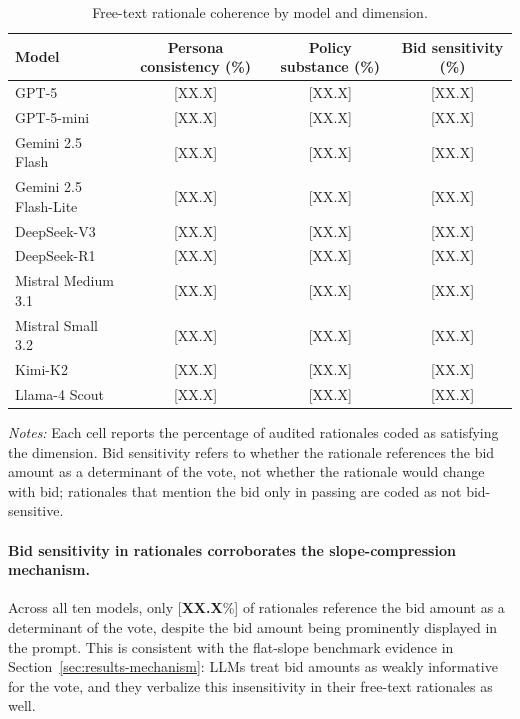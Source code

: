 \documentclass[12pt]{article}
\begin{document}
\begin{table}[h]
    \centering
    \caption{Free-text rationale coherence by model and dimension.}
    \label{tab:rationale}
    \begin{threeparttable}
    \begin{tabular}{lccc}
        \toprule
        Model & Persona consistency (\%) & Policy substance (\%) & Bid sensitivity (\%) \\
        \midrule
        GPT-5                 & [XX.X] & [XX.X] & [XX.X] \\
        GPT-5-mini            & [XX.X] & [XX.X] & [XX.X] \\
        Gemini 2.5 Flash      & [XX.X] & [XX.X] & [XX.X] \\
        Gemini 2.5 Flash-Lite & [XX.X] & [XX.X] & [XX.X] \\
        DeepSeek-V3           & [XX.X] & [XX.X] & [XX.X] \\
        DeepSeek-R1           & [XX.X] & [XX.X] & [XX.X] \\
        Mistral Medium 3.1    & [XX.X] & [XX.X] & [XX.X] \\
        Mistral Small 3.2     & [XX.X] & [XX.X] & [XX.X] \\
        Kimi-K2               & [XX.X] & [XX.X] & [XX.X] \\
        Llama-4 Scout         & [XX.X] & [XX.X] & [XX.X] \\
        \bottomrule
    \end{tabular}
    \begin{tablenotes}\footnotesize
        \item \textit{Notes:} Each cell reports the percentage of audited rationales coded as satisfying the dimension. Bid sensitivity refers to whether the rationale references the bid amount as a determinant of the vote, not whether the rationale would change with bid; rationales that mention the bid only in passing are coded as not bid-sensitive.
    \end{tablenotes}
    \end{threeparttable}
\end{table}

\paragraph{Bid sensitivity in rationales corroborates the slope-compression mechanism.} Across all ten models, only [\textbf{XX.X}\%] of rationales reference the bid amount as a determinant of the vote, despite the bid amount being prominently displayed in the prompt. This is consistent with the flat-slope benchmark evidence in Section~\ref{sec:results-mechanism}: LLMs treat bid amounts as weakly informative for the vote, and they verbalize this insensitivity in their free-text rationales as well.
\end{document}
